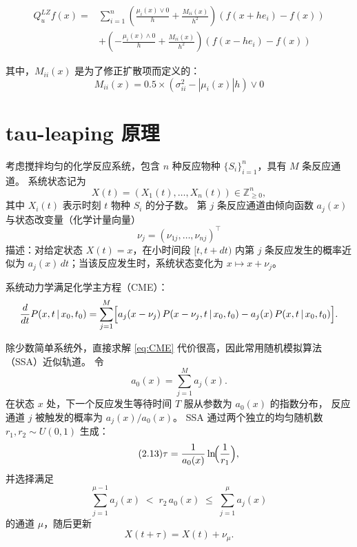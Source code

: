 	\begin{equation}
		\begin{aligned}
			Q_u^{LZ} f(x) = & \sum_{i=1}^{n} \left( \frac{\mu_i(x) \vee 0}{h} + \frac{M_{ii}(x)}{h^2} \right) \left( f(x+he_i) - f(x) \right) \\
			& + \left( -\frac{\mu_i(x) \wedge 0}{h} + \frac{M_{ii}(x)}{h^2} \right) \left( f(x-he_i) - f(x) \right)
		\end{aligned}
	\end{equation}
	
	其中，$M_{ii}(x)$ 是为了修正扩散项而定义的：
	\begin{equation}
		M_{ii}(x) = 0.5 \times (\sigma_{ii}^2 - |\mu_i(x)|h) \vee 0
	\end{equation}

	\section{tau-leaping 原理}
	
	考虑搅拌均匀的化学反应系统，包含 $n$ 种反应物种 $\{S_i\}_{i=1}^n$，具有 $M$ 条反应通道。
	系统状态记为
	\[
	X(t) = (X_1(t),\dots,X_n(t))\in \mathbb{Z}_{\ge 0}^n,
	\]
	其中 $X_i(t)$ 表示时刻 $t$ 物种 $S_i$ 的分子数。
	第 $j$ 条反应通道由倾向函数 $a_j(x)$ 与状态改变量（化学计量向量）
	\[
	\nu_j=(\nu_{1j},\dots,\nu_{nj})^\top
	\]
	描述：对给定状态 $X(t)=x$，在小时间段 $[t,t+dt)$ 内第 $j$ 条反应发生的概率近似为
	$a_j(x)\,dt$；当该反应发生时，系统状态变化为 $x\mapsto x+\nu_j$。
	
	系统动力学满足化学主方程（CME）：
	\begin{equation}\label{eq:CME}
		\frac{d}{dt}P(x,t\,|\,x_0,t_0)
		=
		\sum_{j=1}^M\Bigl[
		a_j(x-\nu_j)\,P(x-\nu_j,t\,|\,x_0,t_0)
		-
		a_j(x)\,P(x,t\,|\,x_0,t_0)
		\Bigr].
	\end{equation}
	
	除少数简单系统外，直接求解 \eqref{eq:CME} 代价很高，因此常用随机模拟算法（SSA）近似轨道。
	令
	\[
	a_0(x)=\sum_{j=1}^M a_j(x).
	\]
	在状态 $x$ 处，下一个反应发生等待时间 $T$ 服从参数为 $a_0(x)$ 的指数分布，
	反应通道 $j$ 被触发的概率为 $a_j(x)/a_0(x)$。
	SSA 通过两个独立的均匀随机数 $r_1,r_2\sim U(0,1)$ 生成：
	\begin{equation}\tag{2.13}\label{eq:SSA_time}
		\tau
		=
		\frac{1}{a_0(x)}
		\ln\!\Bigl(\frac{1}{r_1}\Bigr),
	\end{equation}
	并选择满足
	\begin{equation}\tag{2.14}\label{eq:SSA_channel}
		\sum_{j=1}^{\mu-1}a_j(x)\;<\;r_2\,a_0(x)\;\le\;\sum_{j=1}^{\mu}a_j(x)
	\end{equation}
	的通道 $\mu$，随后更新
	\[
	X(t+\tau)=X(t)+\nu_\mu.
	\]
	
